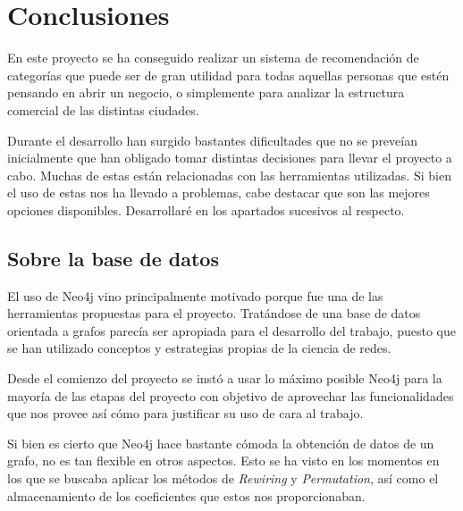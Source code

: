 

\section{Conclusiones}

En este proyecto se ha conseguido realizar un sistema de recomendación de categorías que puede ser de gran utilidad para todas aquellas personas que estén pensando en abrir un negocio, o simplemente para analizar la estructura comercial de las distintas ciudades.


Durante el desarrollo han surgido bastantes dificultades que no se preveían inicialmente que han obligado tomar distintas decisiones para llevar el proyecto a cabo. Muchas de estas están relacionadas con las herramientas utilizadas. Si bien el uso de estas nos ha llevado a problemas, cabe destacar que son las mejores opciones disponibles. Desarrollaré en los apartados sucesivos al respecto.

\subsection{Sobre la base de datos}

El uso de Neo4j vino principalmente motivado porque fue una de las herramientas propuestas para el proyecto. Tratándose de una base de datos orientada a grafos parecía ser apropiada para el desarrollo del trabajo, puesto que se han utilizado conceptos y estrategias propias de la ciencia de redes.

Desde el comienzo del proyecto se instó a usar lo máximo posible Neo4j para la mayoría de las etapas del proyecto con objetivo de aprovechar las funcionalidades que nos provee así cómo para justificar su uso de cara al trabajo.

Si bien es cierto que Neo4j hace bastante cómoda la obtención de datos de un grafo, no es tan flexible en otros aspectos. Esto se ha visto en los momentos en los que se buscaba aplicar los métodos de \textit{Rewiring} y \textit{Permutation}, así como el almacenamiento de los coeficientes que estos nos proporcionaban.

